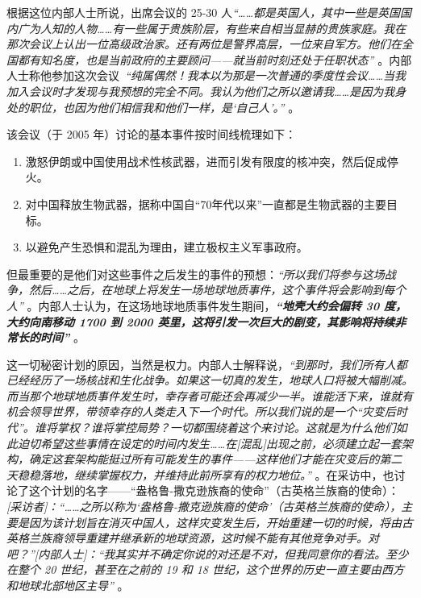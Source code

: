 \documentclass[10pt,twocolumn,letterpaper]{article}
\begin{document}
根据这位内部人士所说，出席会议的 25-30 人\textit{“……都是英国人，其中一些是英国国内广为人知的人物……有一些属于贵族阶层，有些来自相当显赫的贵族家庭。我在那次会议上认出一位高级政治家。还有两位是警界高层，一位来自军方。他们在全国都有知名度，也是当前政府的主要顾问——就当前时刻还处于任职状态”} \cite{4}。内部人士称他参加这次会议\ \textit{“纯属偶然！我本以为那是一次普通的季度性会议……当我加入会议时才发现与我预想的完全不同。我认为他们之所以邀请我……是因为我身处的职位，也因为他们相信我和他们一样，是‘自己人’。”} \cite{4}。

该会议（于 2005 年）讨论的基本事件按时间线梳理如下：

\begin{flushleft}
\begin{enumerate}
    \item 激怒伊朗或中国使用战术性核武器，进而引发有限度的核冲突，然后促成停火。
    \item 对中国释放生物武器，据称中国自“70年代以来”一直都是生物武器的主要目标。
    \item 以避免产生恐惧和混乱为理由，建立极权主义军事政府。
\end{enumerate}
\end{flushleft}

但最重要的是他们对这些事件之后发生的事件的预想：\textit{“所以我们将参与这场战争，然后……之后，在地球上将发生一场地球地质事件，这个事件将会影响到每个人”} \cite{4}。内部人士认为，在这场地球地质事件发生期间，\textit{\textbf{“地壳大约会偏转 30 度，大约向南移动 1700 到 2000 英里，这将引发一次巨大的剧变，其影响将持续非常长的时间”}} \cite{4}。

这一切秘密计划的原因，当然是权力。内部人士解释说，\textit{“到那时，我们所有人都已经经历了一场核战和生化战争。如果这一切真的发生，地球人口将被大幅削减。而当那个地球地质事件发生时，幸存者可能还会再减少一半。谁能活下来，谁就有机会领导世界，带领幸存的人类走入下一个时代。所以我们说的是一个“灾变后时代”。谁将掌权？谁将掌控局势？一切都围绕着这个来讨论。这就是为什么他们如此迫切希望这些事情在设定的时间内发生……在[混乱]出现之前，必须建立起一套架构，确定这套架构能挺过所有可能发生的事件——这样他们才能在灾变后的第二天稳稳落地，继续掌握权力，并维持此前所享有的权力地位。”} \cite{4}。在采访中，也讨论了这个计划的名字——“盎格鲁-撒克逊族裔的使命”（古英格兰族裔的使命）：\textit{[采访者]：“……之所以称为‘盎格鲁-撒克逊族裔的使命’（古英格兰族裔的使命），主要是因为该计划旨在消灭中国人，这样灾变发生后，开始重建一切的时候，将由古英格兰族裔领导重建并继承新的地球资源，这时候不能有其他竞争对手。对吧？”[内部人士]：“我其实并不确定你说的对还是不对，但我同意你的看法。至少在整个 20 世纪，甚至在之前的 19 和 18 世纪，这个世界的历史一直主要由西方和地球北部地区主导”} \cite{4}。
\end{document}
